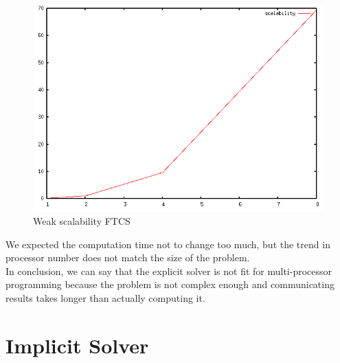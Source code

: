 \documentclass[12pt, a4paper]{report}
\begin{document}
\begin{figure}[H]
\includegraphics[scale=0.5]{report/weakFTCS}
\caption{Weak scalability FTCS}
\end{figure}
We expected the computation time not to change too much, but the trend in processor number does not match the size of the problem.
\\
In conclusion, we can say that the explicit solver is not fit for multi-processor programming because the problem is not complex enough and communicating results takes longer than actually computing it.

\chapter{Implicit Solver}
\end{document}
